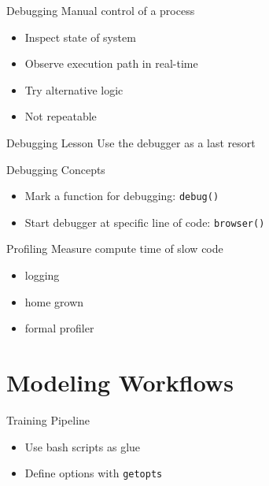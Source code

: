\documentclass{beamer}
\begin{document}
\begin{frame}[fragile]{Debugging}
Manual control of a process

\begin{itemize}
\item Inspect state of system
\item Observe execution path in real-time
\item Try alternative logic
\item Not repeatable
\end{itemize}
\end{frame}


\begin{frame}{Debugging Lesson}
\centering
\huge
\alert{Use the debugger as a last resort}
\end{frame}


\begin{frame}[fragile]{Debugging Concepts}
\begin{itemize}
\item Mark a function for debugging: \lstinline|debug()|
\item Start debugger at specific line of code: \lstinline|browser()|
\end{itemize}

\end{frame}



\begin{frame}[fragile]{Profiling}
Measure compute time of slow code

\begin{itemize}
\item logging
\item home grown
\item formal profiler
\end{itemize}
\end{frame}



\section{Modeling Workflows}

\begin{frame}{Training Pipeline}

\begin{itemize}
\item Use bash scripts as glue
\item Define options with \lstinline|getopts|
\end{itemize}
\end{frame}
\end{document}
